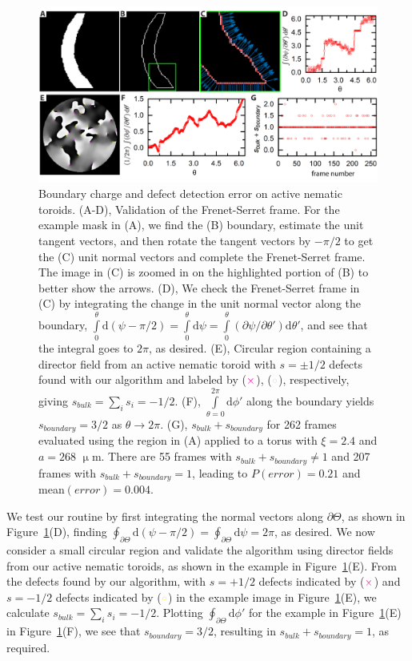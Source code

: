 \begin{figure}
  \centering
  \includegraphics{figures/C3/Ch3-Figs_EdgeChargeErr.png}
  \caption{Boundary charge and defect detection error on active nematic toroids.
  (A-D), Validation of the Frenet-Serret frame.
  For the example mask in (A), we find the (B) boundary, estimate the unit tangent vectors, and then rotate the tangent vectors by $-\pi/2$ to get the (C) unit normal vectors and complete the Frenet-Serret frame.
  The image in (C) is zoomed in on the highlighted portion of (B) to better show the arrows.
  (D), We check the Frenet-Serret frame in (C) by integrating the change in the unit normal vector along the boundary, $\int\limits_{0}^{\theta} \textrm{d}(\psi - \pi/2) = \int\limits_{0}^{\theta} \textrm{d}\psi = \int\limits_{0}^{\theta} (\partial \psi/\partial \theta') \textrm{d}\theta'$, and see that the integral goes to $2 \pi$, as desired.
  (E), Circular region containing a director field from an active nematic toroid with $s = \pm 1/2$ defects found with our algorithm and labeled by (${\color{magenta} \times}$), (${\color{yellow} \circ}$), respectively, giving $s_{bulk} = \sum_i s_i = -1/2$.
  (F), $\int\limits_{\theta = 0}^{2\pi} \textrm{d}\phi'$ along the boundary yields $s_{boundary} = 3/2$ as $\theta \rightarrow 2 \pi$.
  (G), $s_{bulk} + s_{boundary}$ for 262 frames evaluated using the region in (A) applied to a torus with $\xi = 2.4$ and $a = 268$ $\upmu$m.
  There are 55 frames with $s_{bulk} + s_{boundary} \neq 1$ and 207 frames with $s_{bulk} + s_{boundary} = 1$, leading to $P(error) = 0.21$ and mean$(error) = 0.004$.}\label{f:3-EdgeChargeErr}
\end{figure}

We test our routine by first integrating the normal vectors along $\partial \Theta$, as shown in Figure~\ref{f:3-EdgeChargeErr}(D), finding $\oint_{\partial \Theta} \textrm{d}(\psi-\pi/2) = \oint_{\partial \Theta} \textrm{d}\psi = 2\pi$, as desired.
We now consider a small circular region and validate the algorithm using director fields from our active nematic toroids, as shown in the example in Figure~\ref{f:3-EdgeChargeErr}(E).
From the defects found by our algorithm, with $s = +1/2$ defects indicated by (${\color{magenta} \times}$) and $s = -1/2$ defects indicated by (${\color{yellow} \circ}$) in the example image in Figure~\ref{f:3-EdgeChargeErr}(E), we calculate $s_{bulk}= \sum\limits_i s_i=-1/2$.
Plotting $\oint_{\partial \Theta} \textrm{d}\phi'$ for the example in Figure~\ref{f:3-EdgeChargeErr}(E) in Figure~\ref{f:3-EdgeChargeErr}(F), we see that $s_{boundary} = 3/2$, resulting in $s_{bulk}+s_{boundary} = 1$, as required.

